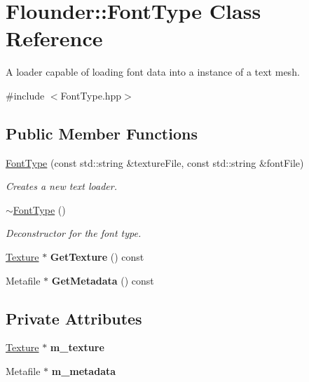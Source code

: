 \hypertarget{class_flounder_1_1_font_type}{}\section{Flounder\+:\+:Font\+Type Class Reference}
\label{class_flounder_1_1_font_type}


A loader capable of loading font data into a instance of a text mesh.  




{\ttfamily \#include $<$Font\+Type.\+hpp$>$}

\subsection*{Public Member Functions}
\begin{DoxyCompactItemize}
\item 
\hyperlink{class_flounder_1_1_font_type_a3709ab2bf78c498c59cba9f475e95c21}{Font\+Type} (const std\+::string \&texture\+File, const std\+::string \&font\+File)
\begin{DoxyCompactList}\small\item\em Creates a new text loader. \end{DoxyCompactList}\item 
\hyperlink{class_flounder_1_1_font_type_a3d4292499d2cf721d0f87f2057c793b0}{$\sim$\+Font\+Type} ()
\begin{DoxyCompactList}\small\item\em Deconstructor for the font type. \end{DoxyCompactList}\item 
\mbox{\label{class_flounder_1_1_font_type_ac49d03cc37bc65aede1241ad67cf72aa}} 
\hyperlink{class_flounder_1_1_texture}{Texture} $\ast$ {\bfseries Get\+Texture} () const
\item 
\mbox{\label{class_flounder_1_1_font_type_a6746db29cf1ace3cd6f0ff595778b10e}} 
Metafile $\ast$ {\bfseries Get\+Metadata} () const
\end{DoxyCompactItemize}
\subsection*{Private Attributes}
\begin{DoxyCompactItemize}
\item 
\mbox{\label{class_flounder_1_1_font_type_a1d6aaf0942d3c81f9340e0603e9ee0bc}} 
\hyperlink{class_flounder_1_1_texture}{Texture} $\ast$ {\bfseries m\+\_\+texture}
\item 
\mbox{\label{class_flounder_1_1_font_type_a223069ed29001a4844ddabaf288d365f}} 
Metafile $\ast$ {\bfseries m\+\_\+metadata}
\end{DoxyCompactItemize}



